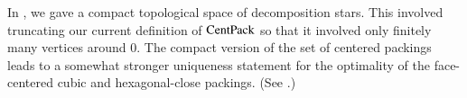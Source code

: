 



\begin{remark} In \cite{DCG}, we gave a compact topological
space of decomposition stars.  This involved truncating our current
definition of ${\operatorname{CentPack}}$ so that it involved only finitely many
vertices around $0$.  The compact version of the set of centered
packings leads to a somewhat stronger uniqueness statement for the
optimality of the face-centered cubic and hexagonal-close
packings.  (See \cite{DCG}.)
\end{remark}









%

%
%
%




